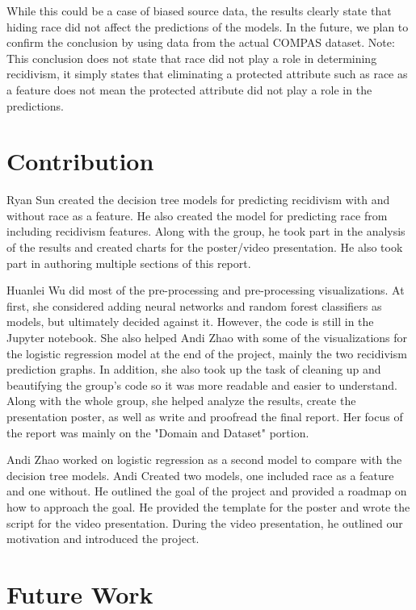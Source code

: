 \documentclass[11pt, sigconf]{acmart}
\begin{document}
While this could be a case of biased source data, the results clearly state that hiding race did not affect the predictions of the models. In the future, we plan to confirm the conclusion by using data from  the actual COMPAS dataset. Note: This conclusion does not state that race did not play a role in determining recidivism, it simply states that eliminating a protected attribute such as race as a feature does not mean the protected attribute did not play a role in the predictions.

\section{Contribution}

\hspace{5mm}Ryan Sun created the decision tree models for predicting recidivism with and without race as a feature. He also created the model for predicting race from including recidivism features. Along with the group, he took part in the analysis of the results and created charts for the poster/video presentation. He also took part in authoring multiple sections of this report. 

Huanlei Wu did most of the pre-processing and pre-processing visualizations. At first, she considered adding neural networks and random forest classifiers as models, but ultimately decided against it. However, the code is still in the Jupyter notebook. She also helped Andi Zhao with some of the visualizations for the logistic regression model at the end of the project, mainly the two recidivism prediction graphs. In addition, she also took up the task of cleaning up and beautifying the group's code so it was more readable and easier to understand. Along with the whole group, she helped analyze the results, create the presentation poster, as well as write and proofread the final report. Her focus of the report was mainly on the "Domain and Dataset" portion. 

Andi Zhao worked on logistic regression as a second model to compare with the decision tree models. Andi Created two models, one included race as a feature and one without. He outlined the goal of the project and provided a roadmap on how to approach the goal. He provided the template for the poster and wrote the script for the video presentation. During the video presentation, he outlined our motivation and introduced the project. 

\section{Future Work}
\end{document}

